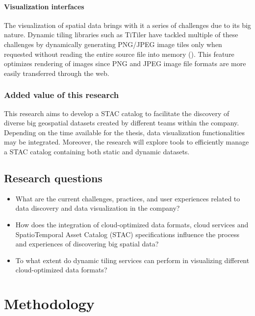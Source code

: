 \documentclass[
  oneside,
  open=any]{scrbook}
\providecommand{\tightlist}{%
  \setlength{\itemsep}{0pt}\setlength{\parskip}{0pt}}\usepackage{longtable,booktabs,array}
\begin{document}
\subsubsection{Visualization interfaces}\label{visualization-interfaces}

The visualization of spatial data brings with it a series of challenges
due to its big nature. Dynamic tiling libraries such as TiTiler have
tackled multiple of these challenges by dynamically generating PNG/JPEG
image tiles only when requested without reading the entire source file
into memory (). This feature optimizes rendering of images since PNG and JPEG
image file formats are more easily transferred through the web.

\subsection{Added value of this
research}\label{added-value-of-this-research}

This research aims to develop a STAC catalog to facilitate the discovery
of diverse big geospatial datasets created by different teams within the
company. Depending on the time available for the thesis, data
visualization functionalities may be integrated. Moreover, the research
will explore tools to efficiently manage a STAC catalog containing both
static and dynamic datasets.

\section{Research questions}\label{research-questions}

\begin{itemize}
\tightlist
\item
  What are the current challenges, practices, and user experiences
  related to data discovery and data visualization in the company?
\item
  How does the integration of cloud-optimized data formats, cloud
  services and SpatioTemporal Asset Catalog (STAC) specifications
  influence the process and experiences of discovering big spatial data?
\item
  To what extent do dynamic tiling services can perform in visualizing
  different cloud-optimized data formats?
\end{itemize}

\chapter{Methodology}\label{methodology}
\end{document}
